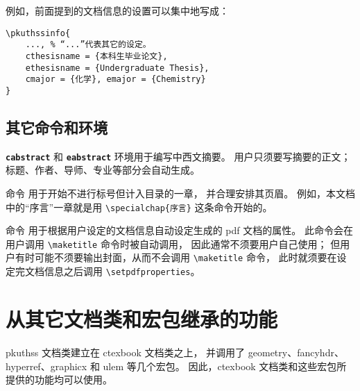 例如，前面提到的文档信息的设置可以集中地写成：
\begin{Verbatim}[frame = single, tabsize = 4]
\pkuthssinfo{
	..., % “...”代表其它的设定。
	cthesisname = {本科生毕业论文},
	ethesisname = {Undergraduate Thesis},
	cmajor = {化学}, emajor = {Chemistry}
}
\end{Verbatim}

\subsection{其它命令和环境}\label{ssec:misc}

\texttt{\bfseries cabstract} 和 \texttt{\bfseries eabstract}
环境用于编写中西文摘要。
用户只须要写摘要的正文；标题、作者、导师、专业等部分会自动生成。

\texttt{\bfseries\string\specialchap} 命令
用于开始不进行标号但计入目录的一章，
并合理安排其页眉。%
例如，本文档中的“序言”一章就是用 \verb|\specialchap{序言}|
这条命令开始的。%

\texttt{\bfseries\string\setpdfproperties} 命令
用于根据用户设定的文档信息自动设定生成的 pdf 文档的属性。
此命令会在用户调用 \verb|\maketitle| 命令时被自动调用，
因此通常不须要用户自己使用；
但用户有时可能不须要输出封面，从而不会调用 \verb|\maketitle| 命令，
此时就须要在设定完文档信息之后调用 \verb|\setpdfproperties|。%

\section{从其它文档类和宏包继承的功能}\label{sec:thirdparty}

pkuthss 文档类建立在 ctexbook\supercite{ctex} 文档类之上，
并调用了 geometry\supercite{geometry}、fancyhdr\supercite{fancyhdr}、%
hyperref\supercite{hyperref}、graphicx\supercite{graphicx}
和 ulem\supercite{ulem} 等几个宏包。
因此，ctexbook 文档类和这些宏包所提供的功能均可以使用。

